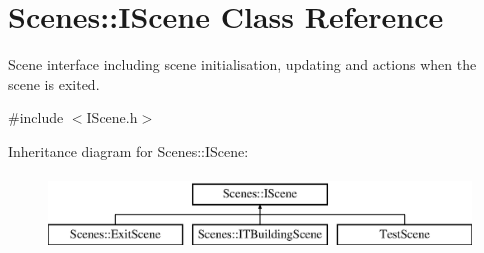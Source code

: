 \hypertarget{class_scenes_1_1_i_scene}{\section{Scenes\-:\-:I\-Scene Class Reference}
\label{class_scenes_1_1_i_scene}
}


Scene interface including scene initialisation, updating and actions when the scene is exited.  




{\ttfamily \#include $<$I\-Scene.\-h$>$}

Inheritance diagram for Scenes\-:\-:I\-Scene\-:\begin{figure}[H]
\begin{center}
\leavevmode
\includegraphics[height=2.000000cm]{class_scenes_1_1_i_scene}
\end{center}
\end{figure}
